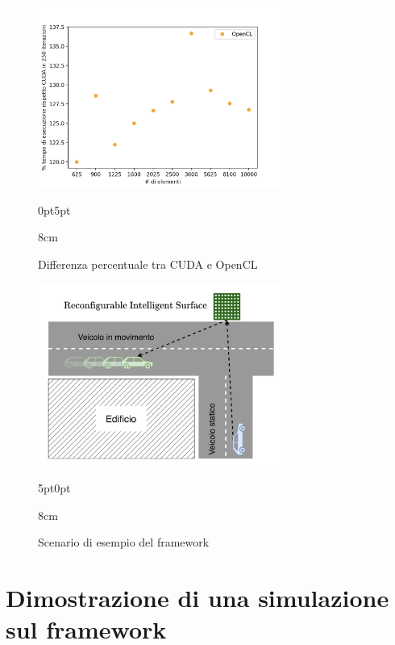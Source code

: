 \begin{figure}[!ht]
  \begin{minipage}[t]{0.5\linewidth}
    \centering
    \includegraphics[width=8cm]{images/results/gain-cuda-vs-opencl.png}
    \begin{adjustwidth}
      {0pt}{5pt}
      \begin{varwidth}
        {8cm}
        \caption{Differenza percentuale tra CUDA e OpenCL}
        \label{fig:risultati-cuda-opencl}
      \end{varwidth}
    \end{adjustwidth}
  \end{minipage}
  \begin{minipage}[t]{0.5\linewidth}
    \centering
    \includegraphics[width=8cm]{images/framework/framework-example.png}
    \begin{adjustwidth}
      {5pt}{0pt}
      \begin{varwidth}
        {8cm}
        \caption{Scenario di esempio del framework}
        \label{fig:framework-scenario}
      \end{varwidth}
    \end{adjustwidth}
  \end{minipage}
\end{figure}

\vfill

\section{Dimostrazione di una simulazione sul framework}
\label{sec:dimostrazione}

